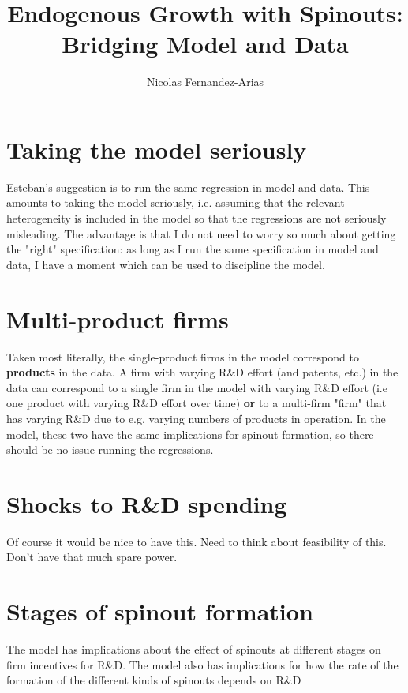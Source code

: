 \documentclass[12pt,english]{article}
\theoremstyle{remark}
\begin{document}
	
	
	
\title{Endogenous Growth with Spinouts: Bridging Model and Data}
\author{Nicolas Fernandez-Arias}
\maketitle

\section{Taking the model seriously}

Esteban's suggestion is to run the same regression in model and data. This amounts to taking the model seriously, i.e. assuming that the relevant heterogeneity is included in the model so that the regressions are not seriously misleading. The advantage is that I do not need to worry so much about getting the "right" specification: as long as I run the same specification in model and data, I have a moment which can be used to discipline the model.

\section{Multi-product firms}

Taken most literally, the single-product firms in the model correspond to \textbf{products} in the data. A firm with varying R\&D effort (and patents, etc.) in the data can correspond to a single firm in the model with varying R\&D effort (i.e one product with varying R\&D effort over time) \textbf{or} to a multi-firm "firm" that has varying R\&D due to e.g. varying numbers of products in operation. In the model, these two have the same implications for spinout formation, so there should be no issue running the regressions. 

\section{Shocks to R\&D spending}

Of course it would be nice to have this. Need to think about feasibility of this. Don't have that much spare power.

\section{Stages of spinout formation}

The model has implications about the effect of spinouts at different stages on firm incentives for R\&D. The model also has implications for how the rate of the formation of the different kinds of spinouts depends on R\&D 
\end{document}
